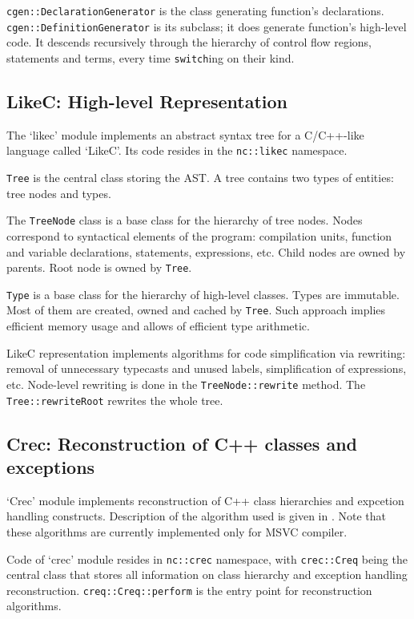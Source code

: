 \documentclass[a4paper,12pt]{article}
\newcommand{\ident}[1]{\texttt{#1}}
\begin{document}
\ident{cgen::DeclarationGenerator} is the class generating function's declarations.
\ident{cgen::DefinitionGenerator} is its subclass; it does generate function's high-level code.
It descends recursively through the hierarchy of control flow regions, statements and terms, every time \ident{switch}ing on their kind.

\subsection{LikeC: High-level Representation}
\label{section:nc:likec}

The `likec' module implements an abstract syntax tree for a C/C++-like language called `LikeC'.
Its code resides in the \ident{nc::likec} namespace.

\ident{Tree} is the central class storing the AST.
A tree contains two types of entities: tree nodes and types.

The \ident{TreeNode} class is a base class for the hierarchy of tree nodes.
Nodes correspond to syntactical elements of the program: compilation units, function and variable declarations, statements, expressions, etc.
Child nodes are owned by parents.
Root node is owned by \ident{Tree}.

\ident{Type} is a base class for the hierarchy of high-level classes.
Types are immutable.
Most of them are created, owned and cached by \ident{Tree}.
Such approach implies efficient memory usage and allows of efficient type arithmetic.

LikeC representation implements algorithms for code simplification via rewriting: removal of unnecessary typecasts and unused labels, simplification of expressions, etc.
Node-level rewriting is done in the \ident{TreeNode::rewrite} method.
The \ident{Tree::rewriteRoot} rewrites the whole tree.

\subsection{Crec: Reconstruction of C++ classes and exceptions}

`Crec' module implements reconstruction of C++ class hierarchies and expcetion handling constructs. 
Description of the algorithm used is given in \cite{fokin2010, fokin2011}.
Note that these algorithms are currently implemented only for MSVC compiler.

Code of `crec' module resides in \ident{nc::crec} namespace, with \ident{crec::Creq} being the central class that stores all information
on class hierarchy and exception handling reconstruction. \ident{creq::Creq::perform} is the entry point for reconstruction algorithms.
\end{document}
